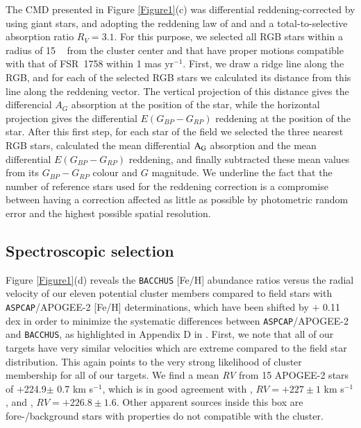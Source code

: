 \documentclass[longauth]{aa} %
\begin{document}
The CMD presented in Figure \ref{Figure1}(c)  was differential reddening-corrected by using giant stars, and adopting the reddening law of \citet{Cardelli1989} and \citet{Donnell1994} and a total-to-selective absorption ratio $R_{V}=3.1$. For this purpose, we selected all RGB stars within a radius of 15 \arcmin ~ from the cluster center and that have proper motions compatible with that of FSR~1758 within 1 mas yr$^{-1}$. First, we draw a ridge line along the RGB, and for each of the selected RGB stars we calculated its distance from this line along the reddening vector. The vertical projection of this distance gives the differencial ${A_{G}}$ absorption at the position of the star, while the horizontal projection gives the differential ${E(G_{BP}-G_{RP})}$ reddening at the position of the star. After this first step, for each star of the field we selected the three nearest RGB stars, calculated the mean differential ${\rm A_{G}}$ absorption and the mean differential ${E(G_{BP}-G_{RP})}$ reddening, and finally subtracted these mean values from its ${G_{BP}-G_{RP}}$ colour and ${G}$ magnitude. We underline the fact that the number of reference stars used for the reddening correction  is a compromise between having a correction affected as little as possible by photometric random error and the highest possible spatial resolution. 

\subsection{Spectroscopic selection}

Figure \ref{Figure1}(d) reveals the \texttt{BACCHUS} [Fe/H] abundance ratios versus the radial velocity of our eleven potential cluster members compared to field stars with \texttt{ASPCAP}/APOGEE-2 [Fe/H] determinations, which have been shifted by $+$ 0.11 dex in order to minimize the systematic differences between \texttt{ASPCAP}/APOGEE-2 and \texttt{BACCHUS}, as highlighted in Appendix D in \citet[][]{Fernnadez-Trincado2020_Aluminum}. First, we note that all of our targets have very similar velocities which are extreme compared to the field star distribution. This again points to the very strong likelihood of cluster membership for all of our targets. We find a mean \textit{RV} from 15 APOGEE-2 stars of $+$224.9$\pm$ 0.7 km s$^{-1}$, which is in good agreement with \citet{Simpson2019}, $RV=+227\pm1$ km s$^{-1}$, and \citet{Villanova2019}, $RV=+226.8\pm1.6$. Other apparent sources inside this box are fore-/background stars with properties do not compatible with the cluster. 
\end{document}
